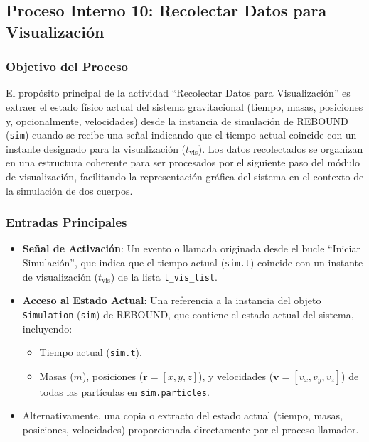 \subsection[Proceso Interno 10: Recolectar Datos]{Proceso Interno 10: Recolectar Datos para Visualización}

\subsubsection{Objetivo del Proceso}
El propósito principal de la actividad ``Recolectar Datos para Visualización'' es extraer el estado físico actual del sistema gravitacional (tiempo, masas, posiciones y, opcionalmente, velocidades) desde la instancia de simulación de REBOUND (\texttt{sim}) cuando se recibe una señal indicando que el tiempo actual coincide con un instante designado para la visualización ($t_{\text{vis}}$). Los datos recolectados se organizan en una estructura coherente para ser procesados por el siguiente paso del módulo de visualización, facilitando la representación gráfica del sistema en el contexto de la simulación de dos cuerpos.

\subsubsection{Entradas Principales}
\begin{itemize}
    \item \textbf{Señal de Activación}: Un evento o llamada originada desde el bucle ``Iniciar Simulación'', que indica que el tiempo actual (\texttt{sim.t}) coincide con un instante de visualización ($t_{\text{vis}}$) de la lista \texttt{t\_vis\_list}.
    \item \textbf{Acceso al Estado Actual}: Una referencia a la instancia del objeto \texttt{Simulation} (\texttt{sim}) de REBOUND, que contiene el estado actual del sistema, incluyendo:
    \begin{itemize}
        \item Tiempo actual (\texttt{sim.t}).
        \item Masas ($m$), posiciones ($\mathbf{r} = [x, y, z]$), y velocidades ($\mathbf{v} = [v_x, v_y, v_z]$) de todas las partículas en \texttt{sim.particles}.
    \end{itemize}
    \item Alternativamente, una copia o extracto del estado actual (tiempo, masas, posiciones, velocidades) proporcionada directamente por el proceso llamador.
\end{itemize}

